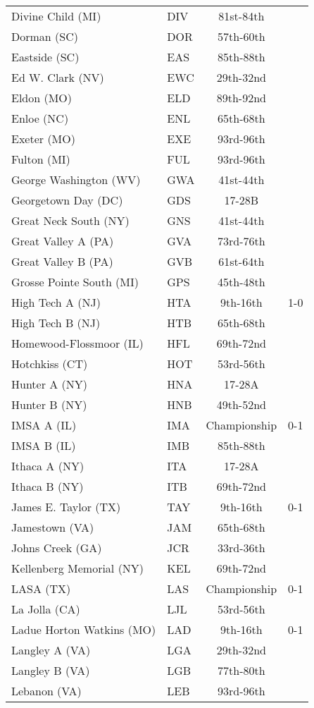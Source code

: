 \documentclass{article}%
\begin{document}
\begin{longtable}{|ll|c|c|}
Divine Child (MI)&DIV&81st{-}84th&\\%
Dorman (SC)&DOR&57th{-}60th&\\%
Eastside (SC)&EAS&85th{-}88th&\\%
Ed W. Clark (NV)&EWC&29th{-}32nd&\\%
Eldon (MO)&ELD&89th{-}92nd&\\%
Enloe (NC)&ENL&65th{-}68th&\\%
Exeter (MO)&EXE&93rd{-}96th&\\%
Fulton (MI)&FUL&93rd{-}96th&\\%
George Washington (WV)&GWA&41st{-}44th&\\%
Georgetown Day (DC)&GDS&17{-}28B&\\%
Great Neck South (NY)&GNS&41st{-}44th&\\%
Great Valley A (PA)&GVA&73rd{-}76th&\\%
Great Valley B (PA)&GVB&61st{-}64th&\\%
Grosse Pointe South (MI)&GPS&45th{-}48th&\\%
High Tech A (NJ)&HTA&9th{-}16th&1{-}0\\%
High Tech B (NJ)&HTB&65th{-}68th&\\%
Homewood{-}Flossmoor (IL)&HFL&69th{-}72nd&\\%
Hotchkiss (CT)&HOT&53rd{-}56th&\\%
Hunter A (NY)&HNA&17{-}28A&\\%
Hunter B (NY)&HNB&49th{-}52nd&\\%
IMSA A (IL)&IMA&Championship&0{-}1\\%
IMSA B (IL)&IMB&85th{-}88th&\\%
Ithaca A (NY)&ITA&17{-}28A&\\%
Ithaca B (NY)&ITB&69th{-}72nd&\\%
James E. Taylor (TX)&TAY&9th{-}16th&0{-}1\\%
Jamestown (VA)&JAM&65th{-}68th&\\%
Johns Creek (GA)&JCR&33rd{-}36th&\\%
Kellenberg Memorial (NY)&KEL&69th{-}72nd&\\%
LASA (TX)&LAS&Championship&0{-}1\\%
La Jolla (CA)&LJL&53rd{-}56th&\\%
Ladue Horton Watkins (MO)&LAD&9th{-}16th&0{-}1\\%
Langley A (VA)&LGA&29th{-}32nd&\\%
Langley B (VA)&LGB&77th{-}80th&\\%
Lebanon (VA)&LEB&93rd{-}96th&\\%

\end{longtable}
\end{document}
